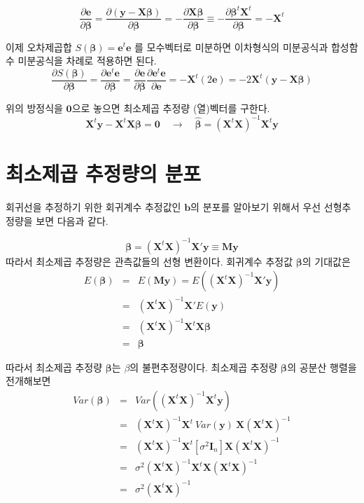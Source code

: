 \documentclass[
]{book}
\newcommand{\pardiff}[2]{\frac{\partial #1}{\partial #2 }}
\theoremstyle{definition}
\theoremstyle{definition}
\theoremstyle{definition}
\theoremstyle{remark}
\begin{document}
\[ \pardiff{\bm e}{\bm \beta} = \pardiff{ (\bm y - \bm X \bm \beta)}{ \bm \beta} =
- \pardiff{ \bm X \bm \beta}{ \bm \beta} \equiv
- \pardiff{\bm \beta^t \bm X^t }{\bm \beta} = -\bm X^t \]

이제 오차제곱합 \(S( {\bm \beta})=\bm e^t \bm e\) 를 모수벡터로 미분하면 이차형식의 미분공식과
합성함수 미분공식을 차례로 적용하면 된다.
\[  \pardiff{ S( {\bm \beta})}{\bm \beta}=\pardiff{\bm e^t \bm e}{\bm \beta} =  \pardiff{\bm e }{\bm \beta} \pardiff{\bm e^t  \bm e}{\bm e} = -\bm X^t \left( 2 \bm e \right ) = -2 \bm X^t (\bm y - \bm X \bm \beta)  \]

위의 방정식을 \(\bm 0\)으로 놓으면 최소제곱 추정량 (열)벡터를 구한다.
\[ \bm X^t \bm y - \bm X^t  \bm X \bm \beta = \bm 0 \quad \rightarrow \quad
\hat{\bm \beta}  = (\bm X^t  \bm X)^{-1} \bm X^t  \bm y \]

\hypertarget{uxcd5cuxc18cuxc81cuxacf1-uxcd94uxc815uxb7c9uxc758-uxbd84uxd3ec}{%
\section{최소제곱 추정량의 분포}\label{uxcd5cuxc18cuxc81cuxacf1-uxcd94uxc815uxb7c9uxc758-uxbd84uxd3ec}}

회귀선을 추정하기 위한 회귀계수 추정값인 \(\bm b\)의 분포를 알아보기 위해서 우선 선형추정량을 보면 다음과 같다.

\[ \bm \beta = (\bm X^t\bm X)^{-1}\bm X' \bm y \equiv  \bm M \bm y \]
따라서 최소제곱 추정량은 관측값들의 선형 변환이다.
회귀계수 추정값 \(\bm \beta\)의 기대값은
\begin{eqnarray*}
 E( \bm \beta) &=& E( \bm M \bm y) = E(( \bm X^t \bm X)^{-1} \bm X' \bm y) \\
 &=& ( \bm X^t \bm X)^{-1} \bm X'E( \bm y) \\
 &=& ( \bm X^t \bm X)^{-1} \bm X^t \bm X \bm \beta \\
  &=& \bm \beta
\end{eqnarray*}

따라서 최소제곱 추정량 \(\bm \beta\)는 \(\beta\)의 불편추정량이다. 최소제곱 추정량 \(\bm \beta\)의 공분산 행렬을 전개해보면
\begin{eqnarray*}
 Var(\bm \beta) &=& Var(( \bm X^t \bm X)^{-1} \bm X^t \bm y) \\
&=& ( \bm X^t \bm X)^{-1} \bm X^t ~ Var( \bm y) ~ \bm X ( \bm X^t \bm X)^{-1} \\
&=&( \bm X^t \bm X)^{-1} \bm X^t[\sigma^2  \bm I_n] \bm X( \bm X^t \bm X)^{-1} \\
&=& \sigma^2( \bm X^t \bm X)^{-1} \bm X^t \bm X( \bm X^t \bm X)^{-1} \\
&=& \sigma^2( \bm X^t \bm X)^{-1} \\
\end{eqnarray*}
\end{document}
